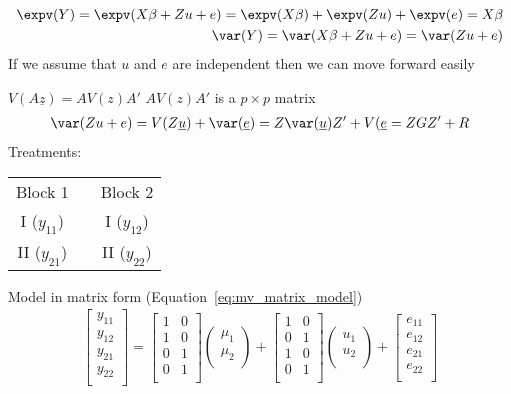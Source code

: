 \documentclass[12pt,letterpaper,oneside]{article}\usepackage{graphicx, color}
\newcommand{\dateTaken}{January 7, 2013}
\begin{document}
\begin{align*}
    \expv(Y)= \expv(X \beta + Z u + e) = \expv(X \beta) + \expv(Z u) + \expv(e)= X \beta\\
    \var(Y) = \var(X \beta + Z u + e) = \var( Z u + e)
\end{align*}
If we assume that $u$ and $e$ are independent then we can move forward easily

$V(A\underline{z})=A V(z) A'$
$A V(z) A'$ is a $p \times p$ matrix
\begin{align*}
    \var( Z u + e)= V(Z\underline{u}) + \var(\underline{e}) = Z \var(\underline{u}) Z' + V(\underline{e} = Z G Z' + R
\end{align*}
\renewcommand{\dateTaken}{February 26, 2013}
\daysep
Treatments:
\begin{tabular}{ccc}
Block 1 &  & Block 2\\
I ($y_{11}$) & & I ($y_{12}$)\\
II ($y_{21}$) & & II ($y_{22}$)\\
\end{tabular}

Model in matrix form (Equation~\ref{eq:mv_matrix_model})
\begin{align}\label{eq:mv_matrix_model}
    \begin{bmatrix}
        y_{11}\\
        y_{12}\\
        y_{21}\\
        y_{22}\\
    \end{bmatrix}
    =\begin{bmatrix}
        1 & 0\\
        1 & 0\\
        0 & 1\\
        0 & 1\\
    \end{bmatrix}
\begin{pmatrix}
    \mu_{1}\\
    \mu_{2}\\
\end{pmatrix} +
\begin{bmatrix}
    1 & 0\\
    0 & 1\\
    1 & 0\\
    0 & 1\\
\end{bmatrix}
\begin{pmatrix}
    u_{1}\\
    u_{2}\\
\end{pmatrix} +
\begin{bmatrix}
    e_{11}\\
    e_{12}\\
    e_{21}\\
    e_{22}\\
\end{bmatrix}
\end{align}
\end{document}
